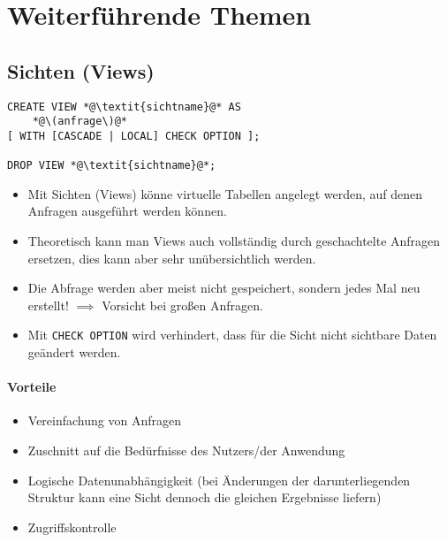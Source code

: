 	\section{Weiterführende Themen} %
		\subsection{Sichten (Views)} %
			\begin{lstlisting}
CREATE VIEW *@\textit{sichtname}@* AS
	*@\(anfrage\)@*
[ WITH [CASCADE | LOCAL] CHECK OPTION ];

DROP VIEW *@\textit{sichtname}@*;
        	\end{lstlisting}

			\begin{itemize}
				\item Mit Sichten (Views) könne virtuelle Tabellen angelegt werden, auf denen Anfragen ausgeführt werden können.
				\item Theoretisch kann man Views auch vollständig durch geschachtelte Anfragen ersetzen, dies kann aber sehr unübersichtlich werden.
				\item Die Abfrage werden aber meist nicht gespeichert, sondern jedes Mal neu erstellt! \(\implies\) Vorsicht bei großen Anfragen.
				\item Mit \lstinline|CHECK OPTION| wird verhindert, dass für die Sicht nicht sichtbare Daten geändert werden.
			\end{itemize}

			\paragraph{Vorteile}
				\begin{itemize}
					\item Vereinfachung von Anfragen
					\item Zuschnitt auf die Bedürfnisse des Nutzers/der Anwendung
					\item Logische Datenunabhängigkeit (bei Änderungen der darunterliegenden Struktur kann eine Sicht dennoch die gleichen Ergebnisse liefern)
					\item Zugriffskontrolle
				\end{itemize}

